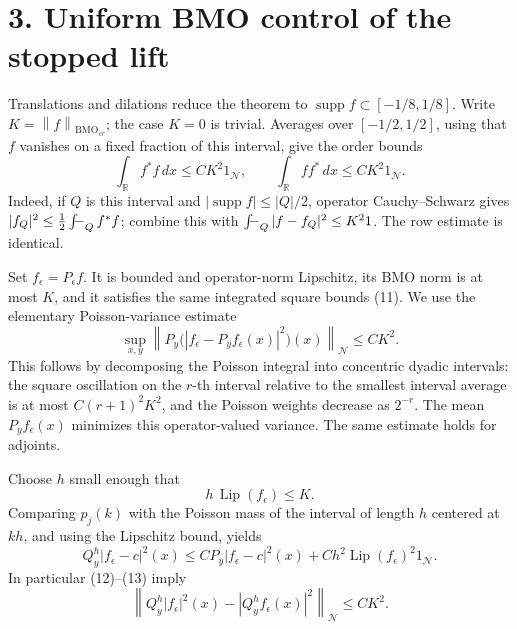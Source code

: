 \documentclass[11pt]{article}
\newcommand{\N}{\mathcal N}
\newcommand{\BMO}{\mathrm{BMO}}
\newcommand{\R}{\mathbb R}
\newcommand{\norm}[1]{\left\|#1\right\|}
\newcommand{\fint}{\mathop{\textstyle\int\kern-1.1ex-}\nolimits}
\begin{document}
\section*{3. Uniform BMO control of the stopped lift}
Translations and dilations reduce the theorem to
\(\operatorname{supp}f\subset[-1/8,1/8]\).
Write \(K=\norm{f}_{\BMO_{cr}}\); the case \(K=0\) is trivial.
Averages over \([-1/2,1/2]\), using that \(f\) vanishes on a fixed
fraction of this interval, give the order bounds
\[
 \int_\R f^*f\,dx\le C K^2 1_\N,\qquad
 \int_\R ff^*\,dx\le C K^2 1_\N.                 \tag{11}
\]
Indeed, if \(Q\) is this interval and
\(|\operatorname{supp}f|\le |Q|/2\), operator Cauchy--Schwarz gives
\(|f_Q|^2\le\frac12\fint_Q f^*f\); combine this with
\(\fint_Q|f-f_Q|^2\le K^2 1\). The row estimate is identical.

Set \(f_\epsilon=P_\epsilon f\).
It is bounded and operator-norm Lipschitz, its BMO norm is at most \(K\),
and it satisfies the same integrated square bounds (11).
We use the elementary Poisson-variance estimate
\[
 \sup_{x,y}\norm{
 P_y\bigl(|f_\epsilon-P_yf_\epsilon(x)|^2\bigr)(x)}_\N
 \le C K^2.                                      \tag{12}
\]
This follows by decomposing the Poisson integral into concentric dyadic
intervals: the square oscillation on the \(r\)-th interval relative
to the smallest interval average is at most \(C(r+1)^2K^2\),
and the Poisson weights decrease as \(2^{-r}\). The mean
\(P_yf_\epsilon(x)\) minimizes this operator-valued variance.
The same estimate holds for adjoints.

Choose \(h\) small enough that
\[
 h\,\operatorname{Lip}(f_\epsilon)\le K.
\]
Comparing \(p_j(k)\) with the Poisson mass of the interval of length
\(h\) centered at \(kh\), and using the Lipschitz bound, yields
\[
 Q^h_y|f_\epsilon-c|^2(x)
 \le C P_y|f_\epsilon-c|^2(x)
       +C h^2\operatorname{Lip}(f_\epsilon)^2 1_\N.       \tag{13}
\]
In particular (12)--(13) imply
\[
 \norm{Q^h_y|f_\epsilon|^2(x)
            -|Q^h_yf_\epsilon(x)|^2}_\N\le C K^2.       \tag{14}
\]
\end{document}
